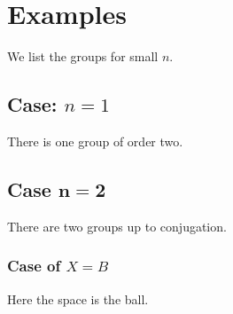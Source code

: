 \documentclass{article}
\begin{document}
\section{Examples}
We list the groups for small $n$.

\subsection*{Case: $n=1$}
There is one group of order two.

\subsection{Case $\boldsymbol{n=2}$}
There are two groups up to conjugation.

\subsubsection{Case of $X=B$}
Here the space is the ball.
\end{document}
